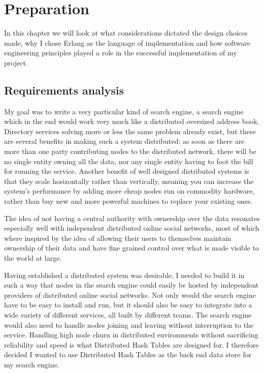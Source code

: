 

\chapter{Preparation}
In this chapter we will look at what considerations dictated the design choices made, why I chose Erlang as the language of implementation and how software engineering principles played a role in the successful implementation of my project.

\section{Requirements analysis}
My goal was to write a very particular kind of search engine, a search engine which in the end would work very much like a distributed oversized address book.
Directory services solving more or less the same problem already exist, but there are several benefits in making such a system distributed: as soon as there are more than one party contributing nodes to the distributed network, there will be no single entity owning all the data, nor any single entity having to foot the bill for running the service. Another benefit of well designed distributed systems is that they scale horizontally rather than vertically, meaning you can increase the system's performance by adding more cheap nodes run on commodity hardware, rather than buy new and more powerful machines to replace your existing ones.

The idea of not having a central authority with ownership over the data resonates especially well with independent distributed online social networks, most of which where inspired by the idea of allowing their users to themselves maintain ownership of their data and have fine grained control over what is made visible to the world at large.

Having established a distributed system was desirable, I needed to build it in such a way that nodes in the search engine could easily be hosted by independent providers of distributed online social networks. Not only would the search engine have to be easy to install and run, but it should also be easy to integrate into a wide variety of different services, all built by different teams. The search engine would also need to handle nodes joining and leaving without interruption to the service.
Handling high node churn in distributed environments without sacrificing reliability and speed is what Distributed Hash Tables are designed for. I therefore decided I wanted to use Distributed Hash Tables as the back end data store for my search engine.

